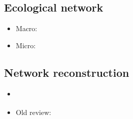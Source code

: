 \subsection{Ecological network}

\begin{itemize}
 \item Macro: \cite{PSK16}
 \item Micro: \cite{FaR12}
\end{itemize}



\subsection{Network reconstruction}

\begin{itemize}
 \item \cite{UlG10}
 \item Old review: \cite{Don08}
\end{itemize}

